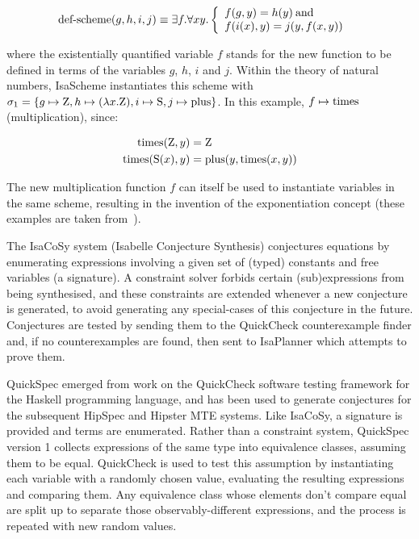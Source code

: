 \[
\text{def-scheme}(g,h,i,j) \equiv\\
  \exists f. \forall x y. \left\{
  \begin{array}{l l}
    f(g,y) = h (y)  \: \text{and}  & \\
    f(i(x),y) = j(y,f(x,y)) & \\
  \end{array} \right.
\]

where the existentially quantified variable $f$ stands for the new
function to be defined in terms of the variables $g$, $h$, $i$ and $j$. Within
the theory of natural numbers, IsaScheme instantiates this scheme with
$\sigma_1 = \{g \mapsto \text{Z}, h \mapsto (\lambda x.\text{Z}), i \mapsto \text{S}, j
\mapsto \text{plus}\}$. In this example, $f \mapsto \text{times}$ (multiplication), since:

\begin{align*}
\text{times}(\text{Z}, y)  &= \text{Z} \\
\text{times}(\text{S}(x), y) &= \text{plus}(y, \text{times}(x, y))
\end{align*}

The new multiplication function $f$ can itself be used to instantiate
variables in the same scheme, resulting in the invention of the
exponentiation concept (these examples are taken from~\cite{MontanoRivas2011}).

The IsaCoSy system (Isabelle Conjecture Synthesis) conjectures equations by
enumerating expressions involving a given set of (typed) constants and free
variables (a signature). A constraint solver forbids certain (sub)expressions
from being synthesised, and these constraints are extended whenever a new
conjecture is generated, to avoid generating any special-cases of this
conjecture in the future. Conjectures are tested by sending them to the
QuickCheck counterexample finder and, if no counterexamples are found, then
sent to IsaPlanner which attempts to prove them.

QuickSpec emerged from work on the QuickCheck software testing framework for the
Haskell programming language, and has been used to generate conjectures for the
subsequent HipSpec and Hipster MTE systems. Like IsaCoSy, a signature is
provided and terms are enumerated. Rather than a constraint system, QuickSpec
version 1 collects expressions of the same type into equivalence classes,
assuming them to be equal. QuickCheck is used to test this assumption by
instantiating each variable with a randomly chosen value, evaluating the
resulting expressions and comparing them. Any equivalence class whose elements
don't compare equal are split up to separate those observably-different
expressions, and the process is repeated with new random values.

